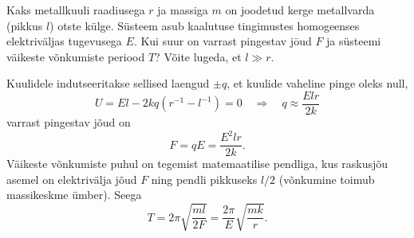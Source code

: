 
Kaks metallkuuli raadiusega $r$ ja massiga $m$ on joodetud kerge metallvarda (pikkus $l$) otste külge. Süsteem asub kaalutuse tingimustes homogeenses elektriväljas tugevusega $E$. Kui suur on varrast pingestav jōud $F$ ja süsteemi väikeste võnkumiste periood $T$? Võite lugeda, et $l \gg r $.

\hint

\solu
Kuulidele indutseeritakse sellised laengud $\pm q$, et kuulide vaheline pinge oleks null,
$$
U=E l-2 k q\left(r^{-1}-l^{-1}\right)=0 \quad \Rightarrow \quad q \approx \frac{E l r}{2 k}
$$
varrast pingestav jõud on
$$
F=q E=\frac{E^{2} l r}{2 k}.
$$
Väikeste võnkumiste puhul on tegemist matemaatilise pendliga, kus raskusjõu asemel on elektrivälja jõud $F$ ning pendli pikkuseks $l / 2$ (võnkumine toimub massikeskme ümber). Seega
$$
T=2 \pi \sqrt{\frac{m l}{2 F}}=\frac{2 \pi}{E} \sqrt{\frac{m k}{r}}.
$$
\probend